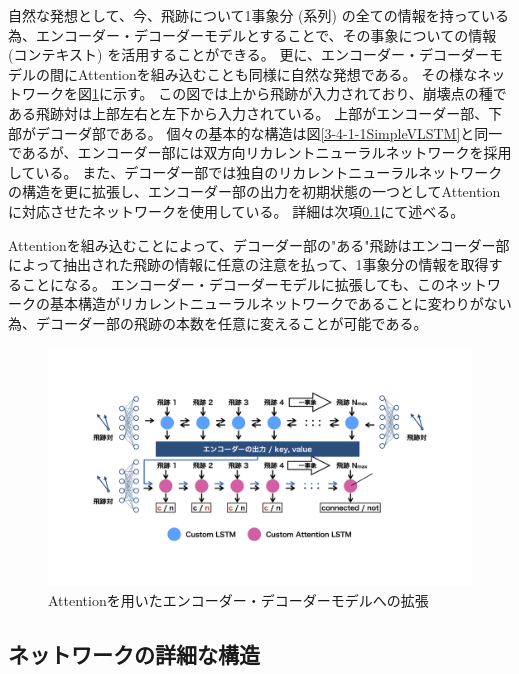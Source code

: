 自然な発想として、今、飛跡について1事象分 (系列) の全ての情報を持っている為、エンコーダー・デコーダーモデルとすることで、その事象についての情報 (コンテキスト) を活用することができる。
更に、エンコーダー・デコーダーモデルの間にAttentionを組み込むことも同様に自然な発想である。
その様なネットワークを図\ref{3-4-1-2EncoderDecoderVLSTM}に示す。
この図では上から飛跡が入力されており、崩壊点の種である飛跡対は上部左右と左下から入力されている。
上部がエンコーダー部、下部がデコーダ部である。
個々の基本的な構造は図\ref{3-4-1-1SimpleVLSTM}と同一であるが、エンコーダー部には双方向リカレントニューラルネットワークを採用している。
また、デコーダー部では独自のリカレントニューラルネットワークの構造を更に拡張し、エンコーダー部の出力を初期状態の一つとしてAttentionに対応させたネットワークを使用している。
詳細は次項\ref{Net:VLSTM:DetailedStructureofVLSTM}にて述べる。

Attentionを組み込むことによって、デコーダー部の"ある"飛跡はエンコーダー部によって抽出された飛跡の情報に任意の注意を払って、1事象分の情報を取得することになる。
エンコーダー・デコーダーモデルに拡張しても、このネットワークの基本構造がリカレントニューラルネットワークであることに変わりがない為、デコーダー部の飛跡の本数を任意に変えることが可能である。

\begin{figure}[htbp]
 \centering
 \includegraphics[trim = 100 200 100 100, width=1.0\textwidth, clip]{Figure/3Networks/3-4-1-2EncoderDecoderVLSTM.png}
 \caption{Attentionを用いたエンコーダー・デコーダーモデルへの拡張}
 \label{3-4-1-2EncoderDecoderVLSTM}
\end{figure}

\subsection{ネットワークの詳細な構造} \label{Net:VLSTM:DetailedStructureofVLSTM}

